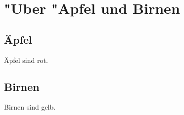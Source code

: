 \documentclass[ngerman]{article} %
\begin{document}
\tableofcontents

\section{"Uber "Apfel und Birnen}

\subsection{Äpfel}
Äpfel sind rot.

\subsection{Birnen}
Birnen sind gelb.
\end{document}

